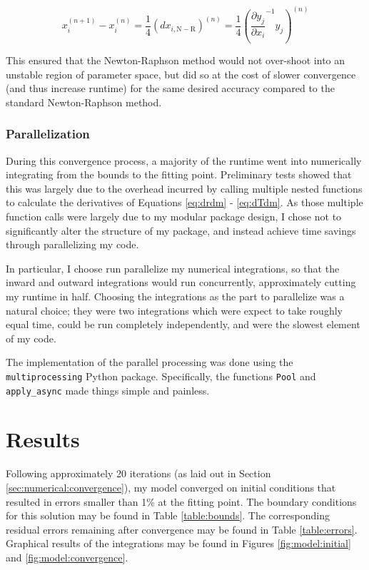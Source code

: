 \begin{equation}
  x_i^{(n+1)} - x_i^{(n)} = \frac{1}{4} \left( dx_{i,\mathrm{N-R}} \right)^{(n)} = \frac{1}{4} \left(  \frac{\partial y_j}{\partial x_i}^{-1} y_j \right)^{(n)}
\end{equation}

This ensured that the Newton-Raphson method would not over-shoot into an unstable region of parameter space, but did so at the cost of slower convergence (and thus increase runtime) for the same desired accuracy compared to the standard Newton-Raphson method.

\subsubsection{Parallelization}
\label{sec:numerical:convergence:parallel}
During this convergence process, a majority of the runtime went into numerically integrating from the bounds to the fitting point. Preliminary tests showed that this was largely due to the overhead incurred by calling multiple nested functions to calculate the derivatives of Equations \ref{eq:drdm} - \ref{eq:dTdm}.  As those multiple function calls were largely due to my modular package design, I chose not to significantly alter the structure of my package, and instead achieve time savings through parallelizing my code.

In particular, I choose run parallelize my numerical integrations, so that the inward and outward integrations would run concurrently, approximately cutting my runtime in half.  Choosing the integrations as the part to parallelize was a natural choice; they were two integrations which were expect to take roughly equal time, could be run completely independently, and were the slowest element of my code.

The implementation of the parallel processing was done using the \texttt{multiprocessing} Python package.  Specifically, the functions \texttt{Pool} and \texttt{apply\_async} made things simple and painless.

\section{Results}
\label{sec:results}
Following approximately 20 iterations (as laid out in Section \ref{sec:numerical:convergence}), my model converged on initial conditions that resulted in errors smaller than 1\% at the fitting point.  The boundary conditions for this solution may be found in Table \ref{table:bounds}.  The corresponding residual errors remaining after convergence may be found in Table \ref{table:errors}.  Graphical results of the integrations may be found in Figures \ref{fig:model:initial} and \ref{fig:model:convergence}.

